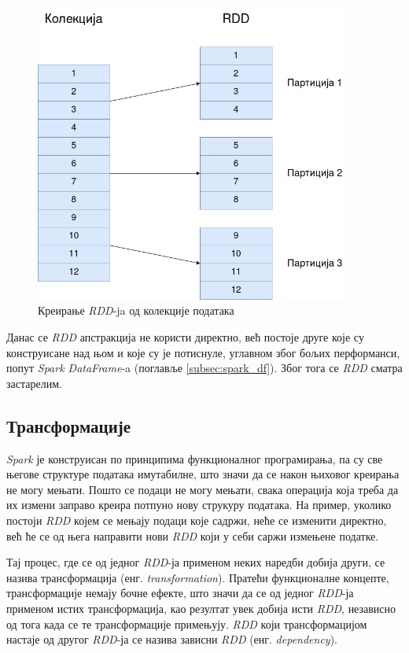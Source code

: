 \documentclass[12pt,oneside]{memoir}
\begin{document}
\begin{figure}[!ht]
  \centering
  \includegraphics[width=0.92\textwidth]{pictures/spark_rdd_creation.png}
  \caption{Креирање \textit{RDD}-ja од колекције података}
  \label{fig:spark_rdd_creation_png}
\end{figure}

Данас се \textit{RDD} апстракција не користи директно, већ постоје друге које су конструисане над њом и које су је потиснуле, углавном због бољих перформанси, попут \textit{Spark DataFrame}-a (поглавље \ref{subsec:spark_df}). Због тога се \textit{RDD} сматра застарелим.

\subsection{Трансформације}
\label{subsec:spark_transf}

\textit{Spark} је конструисан по принципима функционалног програмирања, па су све његове структуре података имутабилне, што значи да се након њиховог креирања не могу мењати. Пошто се подаци не могу мењати, свака операција која треба да их измени заправо креира потпуно нову струкуру података. На пример, уколико постоји \textit{RDD} којем се мењају подаци које садржи, неће се изменити директно, већ ће се од њега направити нови \textit{RDD} који у себи саржи измењене податке. \cite{spark_guide}

Тај процес, где се од једног \textit{RDD}-ја применом неких наредби добија други, се назива трансформација (енг. \textit{transformation}). Пратећи функционалне концепте, трансформације немају бочне ефекте, што значи да се од једног \textit{RDD}-ја применом истих трансформација, као резултат увек добија исти \textit{RDD}, независно од тога када се те трансформације примењују. \textit{RDD} који трансформацијом настаје од другог \textit{RDD}-ја се назива зависни \textit{RDD} (енг. \textit{dependency}). \cite{spark_guide}
\end{document}

